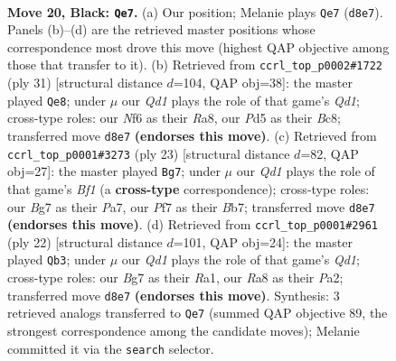 \documentclass[11pt]{article}
\begin{document}
\begin{figure}[p]
\label{fig:thought-m37}
\end{figure}

\clearpage

\begin{figure}[p]\centering
\begin{subfigure}{0.46\textwidth}\centering
\resizebox{\linewidth}{!}{%
\newchessgame
\chessboard[
  setfen={rnbqr1k1/pp3pb1/4pnp1/2Qp3p/P2P3P/1B2BNP1/RPP2P1K/1N2R3 b - - 4 20},
  showmover=false,
  pgfstyle=straightmove, color=movearrow, markmove={d8-e7}
]}
\caption{}
\end{subfigure}\hfill
\begin{subfigure}{0.46\textwidth}\centering
\resizebox{\linewidth}{!}{%
\newchessgame
\chessboard[
  setfen={r1bq1rk1/pp2b1pp/n2npp2/3p4/N2P1P2/1Q2PN2/PP1BB1PP/R1R3K1 b - - 5 16},
  showmover=false,
  pgfstyle=straightmove, color=movearrow, markmove={d8-e8}
]}
\caption{}
\end{subfigure}
\\[4pt]
\begin{subfigure}{0.46\textwidth}\centering
\resizebox{\linewidth}{!}{%
\newchessgame
\chessboard[
  setfen={r3kb1r/pbpq1p1p/1pnp1np1/8/2B1P3/2N2PQ1/PPPB2PP/2KR2NR b kq - 1 12},
  showmover=false,
  pgfstyle=straightmove, color=movearrow, markmove={f8-g7}
]}
\caption{}
\end{subfigure}\hfill
\begin{subfigure}{0.46\textwidth}\centering
\resizebox{\linewidth}{!}{%
\newchessgame
\chessboard[
  setfen={r1b2rk1/pp2ppbp/2n2np1/1qp5/2NP4/2P2NP1/PB2PPBP/R2QR1K1 w - - 6 12},
  showmover=false,
  pgfstyle=straightmove, color=movearrow, markmove={d1-b3}
]}
\caption{}
\end{subfigure}
\caption{\textbf{Move 20, Black: \texttt{Qe7}.} (a) Our position; Melanie plays \texttt{Qe7} (\texttt{d8e7}). Panels (b)--(d) are the retrieved master positions whose correspondence most drove this move (highest QAP objective among those that transfer to it). (b) Retrieved from \texttt{ccrl\_top\_p0002\#1722} (ply 31) [structural distance $d$=104, QAP obj=38]: the master played \texttt{Qe8}; under $\mu$ our \emph{Qd1} plays the role of that game's \emph{Qd1}; cross-type roles: our \emph{N}f6 as their \emph{R}a8, our \emph{P}d5 as their \emph{B}c8; transferred move \texttt{d8e7} \textbf{(endorses this move)}. (c) Retrieved from \texttt{ccrl\_top\_p0001\#3273} (ply 23) [structural distance $d$=82, QAP obj=27]: the master played \texttt{Bg7}; under $\mu$ our \emph{Qd1} plays the role of that game's \emph{Bf1} (a \textbf{cross-type} correspondence); cross-type roles: our \emph{B}g7 as their \emph{P}a7, our \emph{P}f7 as their \emph{B}b7; transferred move \texttt{d8e7} \textbf{(endorses this move)}. (d) Retrieved from \texttt{ccrl\_top\_p0001\#2961} (ply 22) [structural distance $d$=101, QAP obj=24]: the master played \texttt{Qb3}; under $\mu$ our \emph{Qd1} plays the role of that game's \emph{Qd1}; cross-type roles: our \emph{B}g7 as their \emph{R}a1, our \emph{R}a8 as their \emph{P}a2; transferred move \texttt{d8e7} \textbf{(endorses this move)}. Synthesis: 3 retrieved analogs transferred to \texttt{Qe7} (summed QAP objective 89, the strongest correspondence among the candidate moves); Melanie committed it via the \texttt{search} selector.}

\end{figure}
\end{document}
